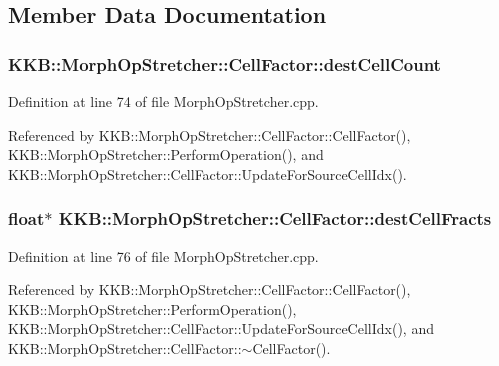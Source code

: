 \subsection{Member Data Documentation}
\subsubsection[{\texorpdfstring{dest\+Cell\+Count}{destCellCount}}]{ K\+K\+B\+::\+Morph\+Op\+Stretcher\+::\+Cell\+Factor\+::dest\+Cell\+Count}\hypertarget{class_morph_op_stretcher_1_1_cell_factor_a4ea39788e14a1b8d0ea4bf0634991f81}{}\label{class_morph_op_stretcher_1_1_cell_factor_a4ea39788e14a1b8d0ea4bf0634991f81}


Definition at line 74 of file Morph\+Op\+Stretcher.\+cpp.



Referenced by K\+K\+B\+::\+Morph\+Op\+Stretcher\+::\+Cell\+Factor\+::\+Cell\+Factor(), K\+K\+B\+::\+Morph\+Op\+Stretcher\+::\+Perform\+Operation(), and K\+K\+B\+::\+Morph\+Op\+Stretcher\+::\+Cell\+Factor\+::\+Update\+For\+Source\+Cell\+Idx().

\subsubsection[{\texorpdfstring{dest\+Cell\+Fracts}{destCellFracts}}]{\setlength{\rightskip}{0pt plus 5cm}float$\ast$ K\+K\+B\+::\+Morph\+Op\+Stretcher\+::\+Cell\+Factor\+::dest\+Cell\+Fracts}\hypertarget{class_morph_op_stretcher_1_1_cell_factor_aaa0ecc31b4ade20727b2a6fa61bf938c}{}\label{class_morph_op_stretcher_1_1_cell_factor_aaa0ecc31b4ade20727b2a6fa61bf938c}


Definition at line 76 of file Morph\+Op\+Stretcher.\+cpp.



Referenced by K\+K\+B\+::\+Morph\+Op\+Stretcher\+::\+Cell\+Factor\+::\+Cell\+Factor(), K\+K\+B\+::\+Morph\+Op\+Stretcher\+::\+Perform\+Operation(), K\+K\+B\+::\+Morph\+Op\+Stretcher\+::\+Cell\+Factor\+::\+Update\+For\+Source\+Cell\+Idx(), and K\+K\+B\+::\+Morph\+Op\+Stretcher\+::\+Cell\+Factor\+::$\sim$\+Cell\+Factor().

